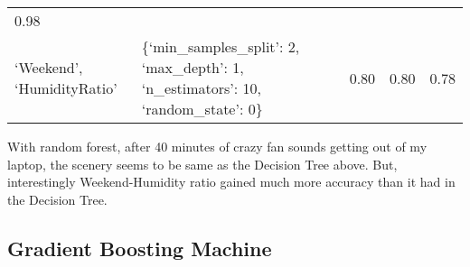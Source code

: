 \documentclass[11pt]{article}
\begin{document}
\begin{longtable}[]{@{}lllll@{}}
\begin{minipage}[t]{0.05\columnwidth}
0.98\strut
\end{minipage}\tabularnewline
\begin{minipage}[t]{0.25\columnwidth}\raggedright
`Weekend', `HumidityRatio'\strut
\end{minipage} & \begin{minipage}[t]{0.47\columnwidth}\raggedright
\{`min\_samples\_split': 2, `max\_depth': 1, `n\_estimators': 10,
`random\_state': 0\}\strut
\end{minipage} & \begin{minipage}[t]{0.05\columnwidth}\raggedright
0.80\strut
\end{minipage} & \begin{minipage}[t]{0.05\columnwidth}\raggedright
0.80\strut
\end{minipage} & \begin{minipage}[t]{0.05\columnwidth}\raggedright
0.78\strut
\end{minipage}\tabularnewline
\bottomrule
\end{longtable}

    With random forest, after 40 minutes of crazy fan sounds getting out of
my laptop, the scenery seems to be same as the Decision Tree above. But,
interestingly Weekend-Humidity ratio gained much more accuracy than it
had in the Decision Tree.

    \hypertarget{gradient-boosting-machine}{%
\subsection{Gradient Boosting Machine}\label{gradient-boosting-machine}}
\end{document}
